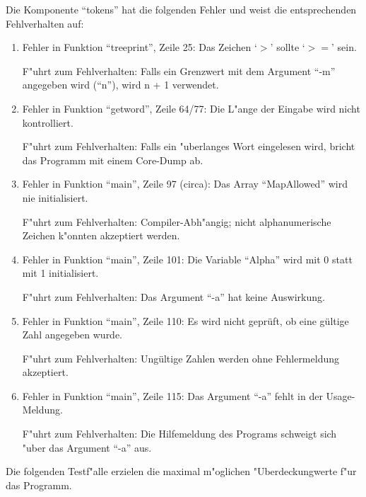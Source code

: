 %
%

Die Komponente ``tokens'' hat die folgenden Fehler und weist die
entsprechenden Fehlverhalten auf:

\begin{enumerate}

\item Fehler in Funktion ``treeprint'', Zeile 25: Das Zeichen `$>$'
sollte `$>=$' sein. 

F"uhrt zum Fehlverhalten:
Falls ein Grenzwert mit dem Argument ``-m'' 
angegeben wird (``n''), wird n + 1 verwendet.


\item Fehler in Funktion ``getword'', Zeile 64/77: Die L"ange der
Eingabe wird nicht kontrolliert. 

F"uhrt zum Fehlverhalten:
Falls ein "uberlanges Wort eingelesen wird,
bricht das Programm mit einem Core-Dump ab.


\item Fehler in Funktion ``main'', Zeile 97 (circa): Das Array
``MapAllowed'' wird nie initialisiert. 

F"uhrt zum Fehlverhalten:  Compiler-Abh"angig; nicht alphanumerische
Zeichen k"onnten akzeptiert werden.


\item Fehler in Funktion ``main'', Zeile 101: Die Variable ``Alpha''
wird mit 0 statt mit 1 initialisiert.  

F"uhrt zum Fehlverhalten:
Das Argument ``-a'' hat keine Auswirkung.


\item Fehler in Funktion ``main'', Zeile 110: Es wird nicht gepr\"uft,
ob eine g\"ultige Zahl angegeben wurde.

F"uhrt zum Fehlverhalten: 
Ung\"ultige Zahlen werden ohne Fehlermeldung akzeptiert.


\item Fehler in Funktion ``main'', Zeile 115: Das Argument ``-a''
fehlt in der Usage-Meldung. 

F"uhrt zum Fehlverhalten:
Die Hilfemeldung des Programs schweigt sich "uber das Argument ``-a'' aus. 

\end{enumerate}

\newpage

Die folgenden Testf"alle erzielen die maximal m"oglichen
"Uberdeckungwerte f"ur das Programm.  


